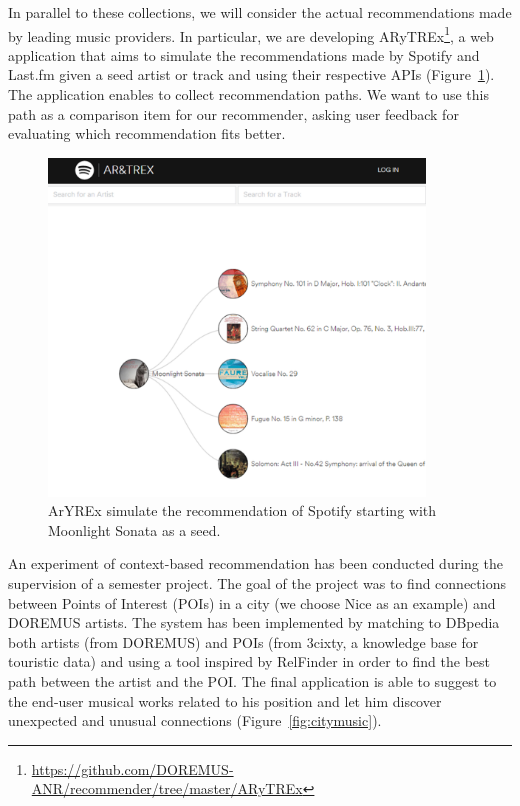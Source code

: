 \documentclass[a4paper,11pt]{report}
\newcommand\figref{Figure~\ref}
\begin{document}
In parallel to these collections, we will consider the actual recommendations made by leading music providers. In particular, we are developing ARyTREx\footnote{\url{https://github.com/DOREMUS-ANR/recommender/tree/master/ARyTREx}}, a web application that aims to simulate the recommendations made by Spotify and Last.fm given a seed artist or track and using their respective APIs (\figref{fig:arytrex}). The application enables to collect recommendation paths. We want to use this path as a comparison item for our recommender, asking user feedback for evaluating which recommendation fits better.

\begin{figure}
 \centerline{
 \includegraphics[width=10cm]{arytrex.png}}
 \caption{ArYREx simulate the recommendation of Spotify starting with Moonlight Sonata as a seed.}
 \label{fig:arytrex}
\end{figure}

An experiment of context-based recommendation has been conducted during the supervision of a semester project. The goal of the project was to find connections between Points of Interest (POIs) in a city (we choose Nice as an example) and DOREMUS artists. The system has been implemented by matching to DBpedia both artists (from DOREMUS) and POIs (from 3cixty, a knowledge base for touristic data) and using a tool inspired by RelFinder in order to find the best path between the artist and the POI. The final application is able to suggest to the end-user musical works related to his position and let him discover unexpected and unusual connections (\figref{fig:citymusic}). 
\end{document}
